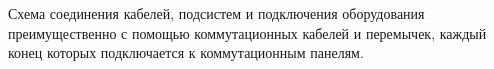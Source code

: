 Схема соединения кабелей, подсистем и подключения
оборудования преимущественно с помощью коммутационных
кабелей и перемычек, каждый конец которых подключается к
коммутационным панелям.